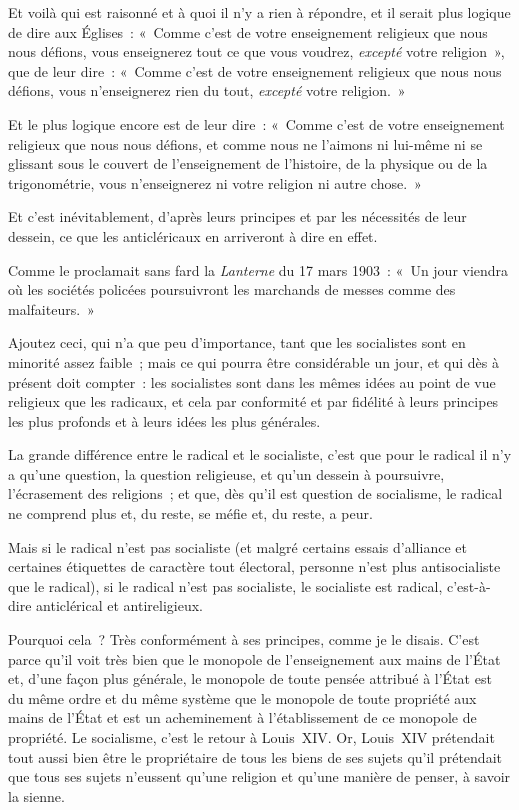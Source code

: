 \documentclass[french,twoside]{book} %
\begin{document}
Et voilà qui est raisonné et à quoi il n’y a rien à répondre, et il serait plus logique de dire aux Églises : « Comme c’est de votre enseignement religieux que nous nous défions, vous enseignerez tout ce que vous voudrez, {\itshape excepté} votre religion », que de leur dire : « Comme c’est de votre enseignement  religieux que nous nous défions, vous n’enseignerez rien du tout, {\itshape excepté} votre religion. »\par
Et le plus logique encore est de leur dire : « Comme c’est de votre enseignement religieux que nous nous défions, et comme nous ne l’aimons ni lui-même ni se glissant sous le couvert de l’enseignement de l’histoire, de la physique ou de la trigonométrie, vous n’enseignerez ni votre religion ni autre chose. »\par
Et c’est inévitablement, d’après leurs principes et par les nécessités de leur dessein, ce que les anticléricaux en arriveront à dire en effet.\par
Comme le proclamait sans fard la \emph{Lanterne} du 17 mars 1903 : « Un jour viendra où les sociétés policées poursuivront les marchands de messes comme des malfaiteurs. »\par
Ajoutez ceci, qui n’a que peu d’importance, tant que les socialistes sont en minorité assez faible ; mais ce qui pourra être considérable un jour, et qui dès à présent doit compter : les socialistes sont dans les mêmes idées au point de vue religieux que les radicaux, et cela par conformité et par fidélité à leurs principes les plus profonds et à leurs idées les plus générales.\par
La grande différence entre le radical et le socialiste, c’est que pour le radical il n’y a qu’une question,  la question religieuse, et qu’un dessein à poursuivre, l’écrasement des religions ; et que, dès qu’il est question de socialisme, le radical ne comprend plus et, du reste, se méfie et, du reste, a peur.\par
Mais si le radical n’est pas socialiste (et malgré certains essais d’alliance et certaines étiquettes de caractère tout électoral, personne n’est plus antisocialiste que le radical), si le radical n’est pas socialiste, le socialiste est radical, c’est-à-dire anticlérical et antireligieux.\par
Pourquoi cela ? Très conformément à ses principes, comme je le disais. C’est parce qu’il voit très bien que le monopole de l’enseignement aux mains de l’État et, d’une façon plus générale, le monopole de toute pensée attribué à l’État est du même ordre et du même système que le monopole de toute propriété aux mains de l’État et est un acheminement à l’établissement de ce monopole de propriété. Le socialisme, c’est le retour à Louis XIV. Or, Louis XIV prétendait tout aussi bien être le propriétaire de tous les biens de ses sujets qu’il prétendait que tous ses sujets n’eussent qu’une religion et qu’une manière de penser, à savoir la sienne.\par
\end{document}
